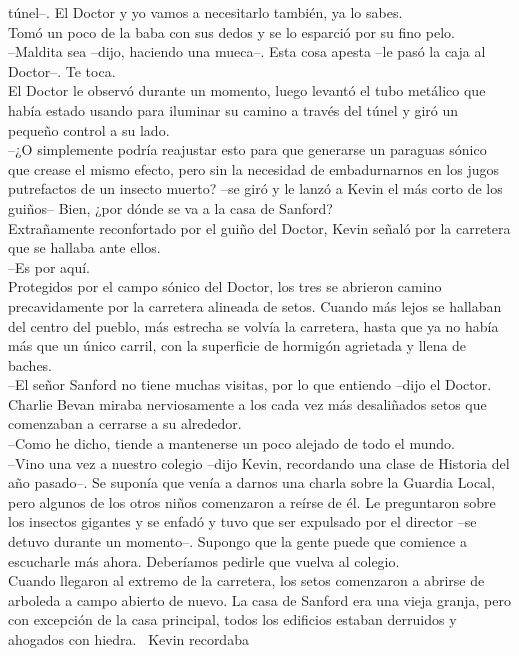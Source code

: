 túnel--. El Doctor y yo vamos a necesitarlo también, ya lo sabes.\\
Tomó un poco de la baba con sus dedos y se lo esparció por su fino
pelo.\\
--Maldita sea --dijo, haciendo una mueca--. Esta cosa apesta --le pasó
la caja al Doctor--. Te toca.\\
El Doctor le observó durante un momento, luego levantó el tubo metálico
que había estado usando para iluminar su camino a través del túnel y
giró un pequeño control a su lado.\\
--¿O simplemente podría reajustar esto para que generarse un paraguas
sónico que crease el mismo efecto, pero sin la necesidad de
embadurnarnos en los jugos putrefactos de un insecto muerto? --se giró y
le lanzó a Kevin el más corto de los guiños-- Bien, ¿por dónde se va a
la casa de Sanford?\\
Extrañamente reconfortado por el guiño del Doctor, Kevin señaló por la
carretera que se hallaba ante ellos.\\
--Es por aquí.\\
Protegidos por el campo sónico del Doctor, los tres se abrieron camino
precavidamente por la carretera alineada de setos. Cuando más lejos se
hallaban del centro del pueblo, más estrecha se volvía la carretera,
hasta que ya no había más que un único carril, con la superficie de
hormigón agrietada y llena de baches.\\
--El señor Sanford no tiene muchas visitas, por lo que entiendo --dijo
el Doctor.\\
Charlie Bevan miraba nerviosamente a los cada vez más desaliñados setos
que comenzaban a cerrarse a su alrededor.\\
--Como he dicho, tiende a mantenerse un poco alejado de todo el mundo.\\
--Vino una vez a nuestro colegio --dijo Kevin, recordando una clase de
Historia del año pasado--. Se suponía que venía a darnos una charla
sobre la Guardia Local, pero algunos de los otros niños comenzaron a
reírse de él. Le preguntaron sobre los insectos gigantes y se enfadó y
tuvo que ser expulsado por el director --se detuvo durante un momento--.
Supongo que la gente puede que comience a escucharle más ahora.
Deberíamos pedirle que vuelva al colegio.\\
Cuando llegaron al extremo de la carretera, los setos comenzaron a
abrirse de arboleda a campo abierto de nuevo. La casa de Sanford era una
vieja granja, pero con excepción de la casa principal, todos los
edificios estaban derruidos y ahogados con hiedra. ~Kevin recordaba
